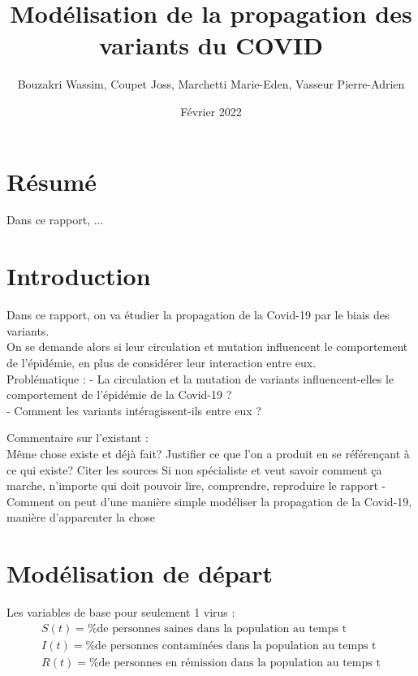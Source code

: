 \documentclass{article}
\title{Modélisation de la propagation des variants du COVID}
\author{Bouzakri Wassim, Coupet Joss, Marchetti Marie-Eden, Vasseur Pierre-Adrien}
\date{Février 2022}
\begin{document}
\maketitle


\section{Résumé}

Dans ce rapport, ...

\section{Introduction}

Dans ce rapport, on va étudier la propagation de la Covid-19 par le biais des variants.\\
On se demande alors si leur circulation et mutation influencent le comportement de l'épidémie, en plus de considérer leur interaction entre eux.\\



Problématique :
- La circulation et la mutation de variants influencent-elles le comportement de l'épidémie de la Covid-19 ?\\
- Comment les variants intéragissent-ils entre eux ?

Commentaire sur l'existant :\\
Même chose existe et déjà fait?
Justifier ce que l'on a produit en se référençant à ce qui existe?
Citer les sources
Si non spécialiste et veut savoir comment ça marche, n'importe qui doit pouvoir lire, comprendre, reproduire le rapport
- Comment on peut d'une manière simple modéliser la propagation de la Covid-19, manière d'apparenter la chose

\section{Modélisation de départ}

Les variables de base pour seulement 1 virus : 
\begin{align}
    S(t)= \text{\% de personnes saines dans la population au temps t} \\
    I(t)= \text{\% de personnes contaminées dans la population au temps t} \\
    R(t)= \text{\% de personnes en rémission dans la population au temps t} \\
\end{align}
\end{document}
